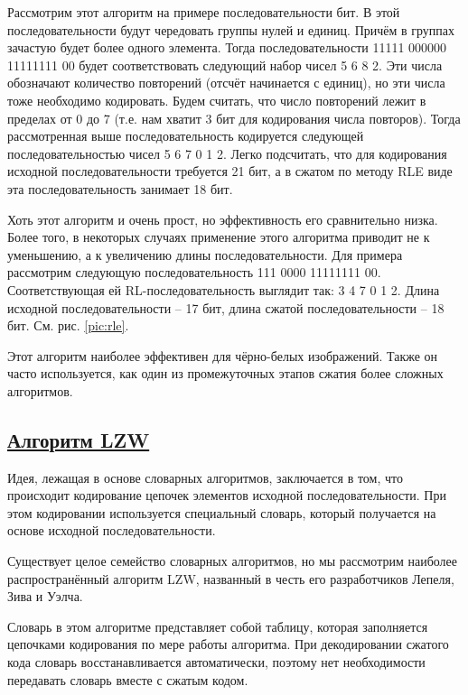 Рассмотрим этот алгоритм на примере последовательности бит. В этой последовательности будут чередовать группы нулей и единиц. Причём в группах зачастую будет более одного элемента. Тогда последовательности 11111 000000 11111111 00 будет соответствовать следующий набор чисел 5 6 8 2. Эти числа обозначают количество повторений (отсчёт начинается с единиц), но эти числа тоже необходимо кодировать. Будем считать, что число повторений лежит в пределах от 0 до 7 (т.е. нам хватит 3 бит для кодирования числа повторов). Тогда рассмотренная выше последовательность кодируется следующей последовательностью чисел 5 6 7 0 1 2. Легко подсчитать, что для кодирования исходной последовательности требуется 21 бит, а в сжатом по методу RLE виде эта последовательность занимает 18 бит.

Хоть этот алгоритм и очень прост, но эффективность его сравнительно низка. Более того, в некоторых случаях применение этого алгоритма приводит не к уменьшению, а к увеличению длины последовательности. Для примера рассмотрим следующую последовательность 111 0000 11111111 00. Соответствующая ей RL-последовательность выглядит так: 3 4 7 0 1 2. Длина исходной последовательности – 17 бит, длина сжатой последовательности – 18 бит. См. рис. \ref{pic:rle}.

Этот алгоритм наиболее эффективен для чёрно-белых изображений. Также он часто используется, как один из промежуточных этапов сжатия более сложных алгоритмов.

\subsection*{\hyperlink{toc}{Алгоритм LZW}}

Идея, лежащая в основе словарных алгоритмов, заключается в том, что происходит кодирование цепочек элементов исходной последовательности. При этом кодировании используется специальный словарь, который получается на основе исходной последовательности. 

Существует целое семейство словарных алгоритмов, но мы рассмотрим наиболее распространённый алгоритм LZW, названный в честь его разработчиков Лепеля, Зива и Уэлча. 

Словарь в этом алгоритме представляет собой таблицу, которая заполняется цепочками кодирования по мере работы алгоритма. При декодировании сжатого кода словарь восстанавливается автоматически, поэтому нет необходимости передавать словарь вместе с сжатым кодом. 

